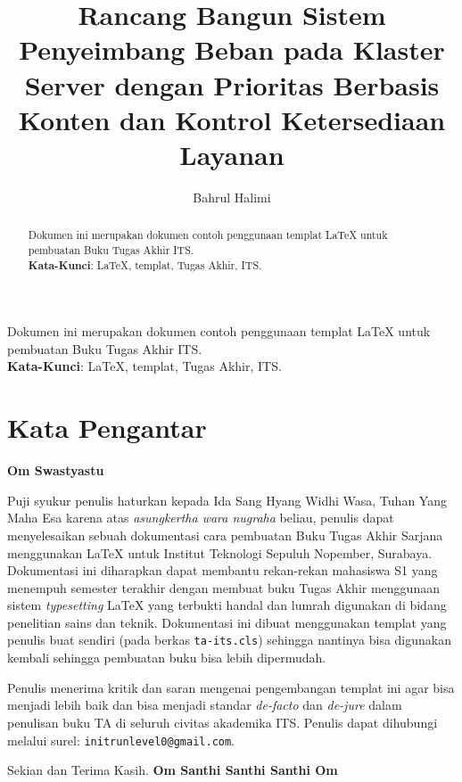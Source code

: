 \documentclass{ta-its}
\title{Rancang Bangun Sistem Penyeimbang Beban pada Klaster Server dengan Prioritas Berbasis Konten dan Kontrol Ketersediaan Layanan}{Design and Implementation of Load Balancing System with Content Priority and Availability Control}{KI1502}
\author{Bahrul Halimi}{5111100014}
\begin{document}
    \frontmatter %
    \maketitle
    \legalityPaper %
    \begin{abstrak}
    	Dokumen ini merupakan dokumen contoh penggunaan templat \LaTeX{} untuk pembuatan Buku Tugas Akhir ITS. \\
    	
    	\noindent \textbf{Kata-Kunci}: \LaTeX{}, templat, Tugas Akhir, ITS.
	\end{abstrak}
   \begin{abstract}
    	Dokumen ini merupakan dokumen contoh penggunaan templat \LaTeX{} untuk pembuatan Buku Tugas Akhir ITS. \\
    	
    	\noindent \textbf{Kata-Kunci}: \LaTeX{}, templat, Tugas Akhir, ITS.
	\end{abstract}
    \chapter{Kata Pengantar}
        \textbf{Om Swastyastu}

        Puji syukur penulis haturkan kepada Ida Sang Hyang Widhi Wasa, Tuhan Yang Maha Esa karena atas \emph{asungkertha wara nugraha} beliau, penulis dapat menyelesaikan sebuah dokumentasi cara pembuatan Buku Tugas Akhir Sarjana menggunakan \LaTeX{} untuk Institut Teknologi Sepuluh Nopember, Surabaya. Dokumentasi ini diharapkan dapat membantu rekan-rekan mahasiswa S1 yang menempuh semester terakhir dengan membuat buku Tugas Akhir menggunaan sistem \emph{typesetting} \LaTeX{} yang terbukti handal dan lumrah digunakan di bidang penelitian sains dan teknik. Dokumentasi ini dibuat menggunakan templat yang penulis buat sendiri (pada berkas \texttt{ta-its.cls}) sehingga nantinya bisa digunakan kembali sehingga pembuatan buku bisa lebih dipermudah.

        Penulis menerima kritik dan saran mengenai pengembangan templat ini agar bisa menjadi lebih baik dan bisa menjadi standar \emph{de-facto} dan \emph{de-jure} dalam penulisan buku TA di seluruh civitas akademika ITS. Penulis dapat dihubungi melalui surel: \texttt{initrunlevel0@gmail.com}.

        Sekian dan Terima Kasih.
        \noindent \textbf{Om Santhi Santhi Santhi Om}

        \cleardoublepage %
\end{document}

